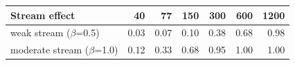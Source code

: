 \begin{tabular}{@{}lrrrrrr@{}}
\toprule
Stream effect & 40 & 77 & 150 & 300 & 600 & 1200 \\
\midrule
weak stream ($\beta${=}0.5) & 0.03 & 0.07 & 0.10 & 0.38 & 0.68 & 0.98 \\
moderate stream ($\beta${=}1.0) & 0.12 & 0.33 & 0.68 & 0.95 & 1.00 & 1.00 \\
\bottomrule
\end{tabular}

